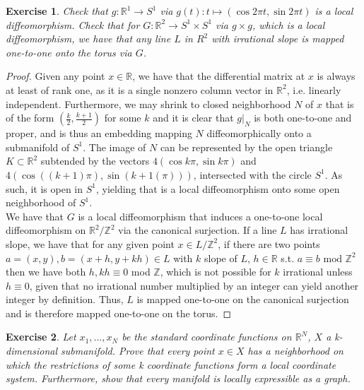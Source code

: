 \documentclass{article}
\newtheorem{exercise}{Exercise}
\begin{document}
        \begin{exercise}
          Check that $g:\mathbb{R}^{1} \to S^{1}$ via $g(t): t \mapsto (\cos 2\pi t, \sin 2\pi t)$ is a local diffeomorphism. Check that for $G: \mathbb{R}^{2} \to S^{1}\times S^{1}$ via $g \times g$, which is a local diffeomorphism, we have that any line $L$ in $R^{2}$ with irrational slope is mapped one-to-one onto the torus via $G$. 
        \end{exercise}
        \begin{proof}
          Given any point $x \in \mathbb{R}$, we have that the differential matrix at $x$ is always at least of rank one, as it is a single nonzero column vector in $\mathbb{R}^{2}$, i.e. linearly independent. Furthermore, we may shrink to closed neighborhood $N$ of $x$ that is of the form $(\frac{k}{2},\frac{k+1}{2})$ for some $k$ and it is clear that $g|_{N}$ is both one-to-one and proper, and is thus an embedding mapping $N$ diffeomorphically onto a submanifold of $S^{1}$. The image of $N$ can be represented by the open triangle $K \subset \mathbb{R}^{2}$ subtended by the vectors $4(\cos k \pi, \sin k \pi)$ and $4(\cos((k+1)\pi), \sin(k+1(\pi)))$, intersected with the circle $S^{1}$. As such, it is open in $S^{1}$, yielding that is a local diffeomorphism onto some open neighborhood of $S^{1}$. \\
          We have that $G$ is a local diffeomorphism that induces a one-to-one local diffeomorphism on $\mathbb{R}^{2}/\mathbb{Z}^{2}$ via the canonical surjection. If a line $L$ has irrational slope, we have that for any given point $x \in L/\mathbb{Z}^{2}$, if there are two points $a = (x,y),b = (x + h, y + kh) \in L$ with $k$ slope of $L$, $h \in \mathbb{R}$ s.t. $a \equiv b \text{ mod } \mathbb{Z}^{2}$ then we have both $h, kh \equiv 0$ mod $\mathbb{Z}$, which is not possible for $k$ irrational unless $h\equiv0$, given that no irrational number multiplied by an integer can yield another integer by definition. Thus, $L$ is mapped one-to-one on the canonical surjection and is therefore mapped one-to-one on the torus.           
        \end{proof}

        \begin{exercise}
          Let $x_{1},...,x_{N}$ be the standard coordinate functions on $\mathbb{R}^{N}$, $X$ a k-dimensional submanifold. Prove that every point $x \in X$ has a neighborhood on which the restrictions of some k coordinate functions form a local coordinate system. Furthermore, show that every manifold is locally expressible as a graph.
        \end{exercise}
\end{document}
